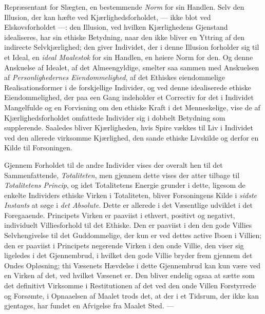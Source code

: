 Repræsentant for Slægten, en bestemmende \emph{Norm} for sin Handlen. Selv den
Illusion, der kan hæfte ved Kjærlighedsforholdet, --- ikke blot ved
Elskovsforholdet ---: den Illusion, ved hvilken Kjærlighedens Gjenstand
idealiseres, har sin ethiske Betydning, naar den ikke bliver en Yttring af den
indirecte Selvkjærlighed; den giver Individet, der i denne Illusion forholder sig
til et Ideal, en \emph{ideal Maalestok} for sin Handlen, en høiere Norm for den.
Og denne Anskuelse af Idealet, af det Almeengyldige, smelter saa sammen med
Anskuelsen af \emph{Personlighedernes Eiendommelighed}, af det Ethiskes
eiendommelige Realisationsformer i de forskjellige Individer, og ved denne
idealiserede ethiske Eiendommelighed, der paa een Gang indeholder et Correctiv
for det i Individet Mangelfulde og en Forvisning om den ethiske Kraft i det
Menneskelige, vise de af Kjærlighedsforholdet omfattede Individer sig i dobbelt
Betydning som supplerende. Saaledes bliver Kjærligheden, hvis Spire vækkes til
Liv i Individet ved den allerede virksomme Kjærlighed, den sande ethiske
Livskilde og derfor en Kilde til Forsoningen.

Gjennem Forholdet til de andre Individer vises der overalt hen til det
Sammenfattende, \emph{Totaliteten}, men
 gjennem dette vises der atter tilbage til \emph{Totalitetens Princip}, og idet
Totalitetens Energie grunder i dette, ligesom de enkelte Individers ethiske
Virken i Totaliteten, bliver Forsoningens Kilde i \emph{sidste Instants} at søge
i \emph{det Absolute}. Dette er allerede i det Væsentlige udviklet i det
Foregaaende. Principets Virken er paaviist i ethvert, positivt og negativt,
individuelt Villiesforhold til det Ethiske. Den er paaviist i den den gode
Villies Selvhengivelse til det Guddommelige, der kun er ved dettes active Iboen i
Villien; den er paaviist i Principets negerende Virken i den onde Villie, den
viser sig ligeledes i det Gjennembrud, i hvilket den gode Villie bryder frem
gjennem det Ondes Opløsning; thi Væsenets Hævdelse i dette Gjennembrud kan kun
være ved en Virken af det, ved hvilket Væsenet er. Den bliver endelig ogsaa at
sætte som det definitivt Virksomme i Restitutionen af det ved den onde Villen
Forstyrrede og Forsømte, i Opnaaelsen af Maalet trods det, at der i et Tidsrum,
der ikke kan gjentages, har fundet en Afvigelse fra Maalet Sted. ---

